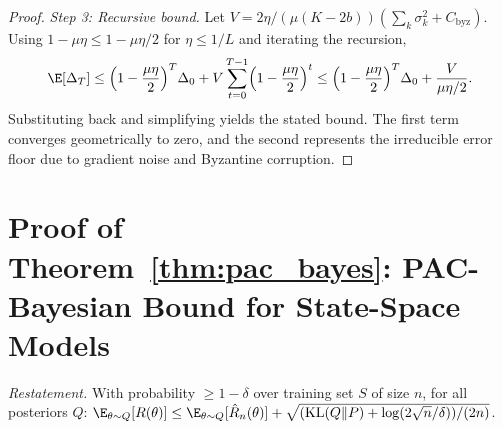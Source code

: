 \begin{proof}
\textit{Step 3: Recursive bound.} Let $V = 2\eta/(\mu(K{-}2b))(\sum_k\sigma_k^2 + C_{\mathrm{byz}})$. Using $1-\mu\eta\le 1-\mu\eta/2$ for $\eta\le 1/L$ and iterating the recursion,
\begin{equation}
\E[\Delta_T]
\le \Bigl(1-\frac{\mu\eta}{2}\Bigr)^T \Delta_0 + V\sum_{t=0}^{T-1}\Bigl(1-\frac{\mu\eta}{2}\Bigr)^t
\le \Bigl(1-\frac{\mu\eta}{2}\Bigr)^T \Delta_0 + \frac{V}{\mu\eta/2}.
\end{equation}
Substituting back and simplifying yields the stated bound. The first term converges geometrically to zero, and the second represents the irreducible error floor due to gradient noise and Byzantine corruption.
\end{proof}


\section{Proof of Theorem~\ref{thm:pac_bayes}: PAC-Bayesian Bound for State-Space Models}
\label{app:proof_pac}

\noindent\textit{Restatement.} With probability $\ge 1-\delta$ over training set $S$ of size $n$, for all posteriors $Q$: $\E_{\theta\sim Q}[R(\theta)]\le\E_{\theta\sim Q}[\hat{R}_n(\theta)] + \sqrt{(\mathrm{KL}(Q\|P)+\log(2\sqrt{n}/\delta))/(2n)}$.

